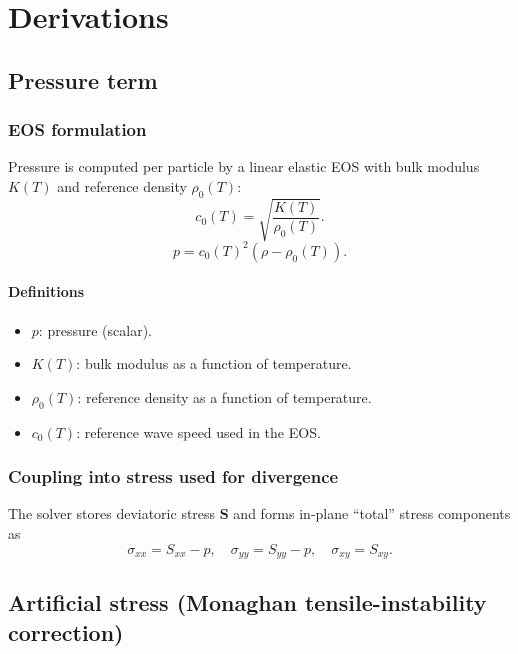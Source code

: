 \documentclass[11pt]{article}
\begin{document}
\section{Derivations}

\subsection{Pressure term}

\subsubsection{EOS formulation}

Pressure is computed per particle by a linear elastic EOS with bulk modulus $K(T)$ and reference density $\rho_0(T)$:
\begin{equation}
c_0(T)=\sqrt{\frac{K(T)}{\rho_0(T)}}.
\label{eq:c0}
\end{equation}
\begin{equation}
p = c_0(T)^2\left(\rho-\rho_0(T)\right).
\label{eq:eos}
\end{equation}

\paragraph{Definitions}
\begin{itemize}
  \item $p$: pressure (scalar).
  \item $K(T)$: bulk modulus as a function of temperature.
  \item $\rho_0(T)$: reference density as a function of temperature.
  \item $c_0(T)$: reference wave speed used in the EOS.
\end{itemize}

\subsubsection{Coupling into stress used for divergence}

The solver stores deviatoric stress $\bm{S}$ and forms in-plane ``total'' stress components as
\begin{equation}
\sigma_{xx}=S_{xx}-p,\quad \sigma_{yy}=S_{yy}-p,\quad \sigma_{xy}=S_{xy}.
\label{eq:sigma_from_Sp}
\end{equation}

\subsection{Artificial stress (Monaghan tensile-instability correction)}
\end{document}
